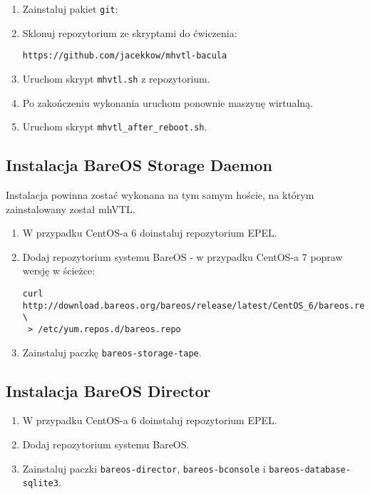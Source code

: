 \documentclass[polish]{article}
\begin{document}
\begin{enumerate}
\item Zainstaluj pakiet \texttt{git}:

\item Sklonuj repozytorium ze skryptami do ćwiczenia:
\begin{verbatim}
https://github.com/jacekkow/mhvtl-bacula
\end{verbatim}

\item Uruchom skrypt \texttt{mhvtl.sh} z repozytorium.

\item Po zakończeniu wykonania uruchom ponownie maszynę wirtualną.

\item Uruchom skrypt \texttt{mhvtl\_after\_reboot.sh}.

\end{enumerate}

\subsection*{Instalacja BareOS Storage Daemon}

Instalacja powinna zostać wykonana na tym samym hoście,
na którym zainstalowany został mhVTL.

\begin{enumerate}

\item W przypadku CentOS-a 6 doinstaluj repozytorium EPEL.

\item Dodaj repozytorium systemu BareOS - w przypadku CentOS-a 7 popraw wersję w ścieżce:
\begin{verbatim}
curl http://download.bareos.org/bareos/release/latest/CentOS_6/bareos.repo \
 > /etc/yum.repos.d/bareos.repo
\end{verbatim}

\item Zainstaluj paczkę \texttt{bareos-storage-tape}.

\end{enumerate}

\subsection*{Instalacja BareOS Director}

\begin{enumerate}

\item W przypadku CentOS-a 6 doinstaluj repozytorium EPEL.

\item Dodaj repozytorium systemu BareOS.

\item Zainstaluj paczki \texttt{bareos-director}, \texttt{bareos-bconsole} i \texttt{bareos-database-sqlite3}.

\end{enumerate}
\end{document}
